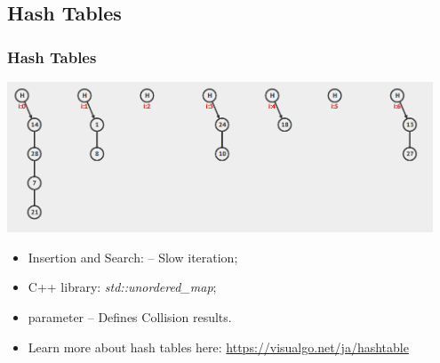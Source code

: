 %
%

\subsection{Hash Tables}
\begin{frame}[fragile]
  \frametitle{Hash Tables}

  \includegraphics[width=0.95\textwidth]{img/hash}

  \begin{itemize}
  \item Insertion and Search:  -- \alert{Slow iteration};
  \item C++ library: \emph{std::unordered\_map};
  \item {} parameter -- Defines Collision results.
  \item Learn more about hash tables here: \url{https://visualgo.net/ja/hashtable}
  \end{itemize}
\end{frame}
